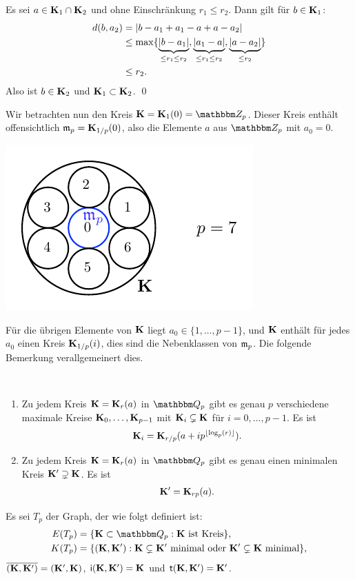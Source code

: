 \documentclass[a4paper, 12pt, twoside]{article}
\begin{document}
\bew Es sei $a\in \mathbf{K}_1\cap\mathbf{K}_2$ und ohne Einschränkung
$r_1\leq r_2$. Dann gilt für $b\in \mathbf{K}_1$:
\begin{align*}
d(b,a_2) &= |b-a_1+a_1-a+a-a_2| \\
&\leq \max\{\underbrace{|b-a_1|}_{\leq r_1\leq r_2},
\underbrace{|a_1-a|}_{\leq r_1\leq r_2},
\underbrace{|a-a_2|}_{\leq r_2}\} \\
&\leq r_2.
\end{align*}
Also ist $b\in \mathbf{K}_2$ und $\mathbf{K}_1\subset \mathbf{K}_2$.
\qed

Wir betrachten nun den Kreis $\KU=\KU_1(0)=\ZZ_p$.
Dieser Kreis enthält offensichtlich $\mathfrak{m}_p=\mathbf{K}_{1/p}(0)$, also
die Elemente $a$ aus $\ZZ_p$ mit $a_0=0$.
\begin{center}
	\includegraphics{grugraImages/kreisQp}
\end{center}
Für die übrigen Elemente von $\mathbf{K}$ liegt $a_0\in\{1,\ldots,p-1\}$,
und $\mathbf{K}$ enthält für jedes $a_0$ einen Kreis $\mathbf{K}_{1/p}(i)$, dies
sind die Nebenklassen von $\mathfrak{m}_p$.
Die folgende Bemerkung verallgemeinert dies.

\BEM\ \label{bem_kreisQp}
\begin{enumerate}
\item Zu jedem Kreis $\mathbf{K}=\mathbf{K}_r(a)$ in $\QQ_p$ gibt es genau $p$
verschiedene maximale Kreise $\mathbf{K}_0,\ldots,\mathbf{K}_{p-1}$ mit
$\mathbf{K}_i\subsetneq \mathbf{K}$ für $i=0,\ldots,p-1$.
Es ist
\[
\mathbf{K}_i = \mathbf{K}_{r/p}(a+i p^{\lfloor\log_p(r)\rfloor}).
\]
\item Zu jedem Kreis $\mathbf{K}=\mathbf{K}_r(a)$ in $\QQ_p$ gibt es genau einen
minimalen Kreis $\mathbf{K}'\supsetneq \mathbf{K}$. Es ist
\[
\mathbf{K}' = \mathbf{K}_{rp}(a).
\]
\end{enumerate}

\DEF Es sei $T_p$ der Graph, der wie folgt definiert ist:
\begin{align*}
E(T_p) &= \{ \KU\subset\QQ_p : \KU \text{ ist Kreis} \}, \\
K(T_p) &= \{ (\KU,\KU') : \KU\subsetneq \KU' \text{ minimal oder }
\KU'\subsetneq \KU \text{ minimal} \},
\end{align*}
$\overline{(\mathbf{K},\mathbf{K}')}=(\mathbf{K}',\mathbf{K})$, $\mathsf{i}(\mathbf{K},\mathbf{K}')=\mathbf{K}$ und
$\mathsf{t}(\mathbf{K},\mathbf{K}')=\mathbf{K}'$.
\end{document}
